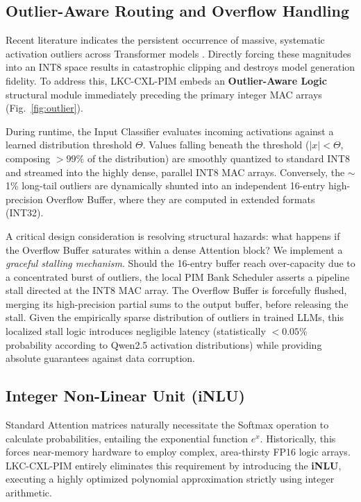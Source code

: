 \documentclass[10pt,conference]{IEEEtran}
\begin{document}
\subsection{Outlier-Aware Routing and Overflow Handling}
Recent literature indicates the persistent occurrence of massive, systematic activation outliers across Transformer models \cite{llm_outliers}. Directly forcing these magnitudes into an INT8 space results in catastrophic clipping and destroys model generation fidelity. To address this, LKC-CXL-PIM embeds an \textbf{Outlier-Aware Logic} structural module immediately preceding the primary integer MAC arrays (Fig.~\ref{fig:outlier}).

During runtime, the Input Classifier evaluates incoming activations against a learned distribution threshold $\Theta$. Values falling beneath the threshold ($|x| < \Theta$, composing $>99\%$ of the distribution) are smoothly quantized to standard INT8 and streamed into the highly dense, parallel INT8 MAC arrays. Conversely, the $\sim$1\% long-tail outliers are dynamically shunted into an independent 16-entry high-precision Overflow Buffer, where they are computed in extended formats (INT32). 

A critical design consideration is resolving structural hazards: what happens if the Overflow Buffer saturates within a dense Attention block? We implement a \textit{graceful stalling mechanism}. Should the 16-entry buffer reach over-capacity due to a concentrated burst of outliers, the local PIM Bank Scheduler asserts a pipeline stall directed at the INT8 MAC array. The Overflow Buffer is forcefully flushed, merging its high-precision partial sums to the output buffer, before releasing the stall. Given the empirically sparse distribution of outliers in trained LLMs, this localized stall logic introduces negligible latency (statistically $<0.05\%$ probability according to Qwen2.5 activation distributions) while providing absolute guarantees against data corruption.

\subsection{Integer Non-Linear Unit (iNLU)}
Standard Attention matrices naturally necessitate the Softmax operation to calculate probabilities, entailing the exponential function $e^x$. Historically, this forces near-memory hardware to employ complex, area-thirsty FP16 logic arrays. LKC-CXL-PIM entirely eliminates this requirement by introducing the \textbf{iNLU}, executing a highly optimized polynomial approximation strictly using integer arithmetic.
\end{document}
